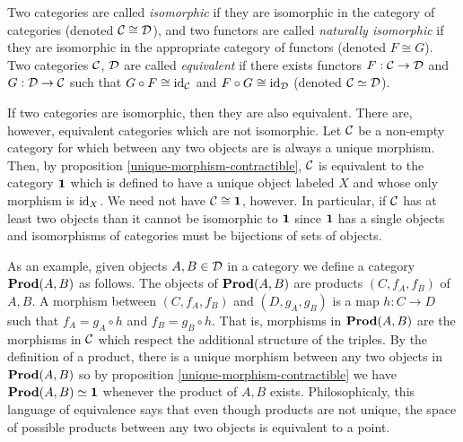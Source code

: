 \begin{defn} Two categories are called {\em isomorphic} if they are isomorphic in the category of categories (denoted ${\mathcal C}\cong {\mathcal D}$), and two functors are called {\em naturally isomorphic} if they are isomorphic in the appropriate category of functors (denoted $F\cong G$). Two categories ${\mathcal C}$, ${\mathcal D}$ are called {\em equivalent} if there exists functors $F:{\mathcal C}\to {\mathcal D}$ and $G:{\mathcal D}\to {\mathcal C}$ such that $G\circ F\cong\operatorname{id}_{\mathcal C}$ and $F\circ G\cong \operatorname{id}_{\mathcal D}$ (denoted ${\mathcal C}\simeq {\mathcal D}$).
\end{defn}

\begin{rem} If two categories are isomorphic, then they are also equivalent. There are, however, equivalent categories which are not isomorphic. Let ${\mathcal C}$ be a non-empty category for which between any two objects are is always a unique morphism. Then, by proposition \ref{unique-morphism-contractible}, ${\mathcal C}$ is equivalent to the category ${\bf 1}$ which is defined to have a unique object labeled $X$ and whose only morphism is $\operatorname{id}_X$. We need not have ${\mathcal C}\cong {\bf 1}$, however. In particular, if ${\mathcal C}$ has at least two objects than it cannot be isomorphic to $\bf 1$ since $\bf 1$ has a single objects and isomorphisms of categories must be bijections of sets of objects.

As an example, given objects $A,B\in {\mathcal D}$ in a category we define a category ${\bf Prod}(A,B)$ as follows. The objects of ${\bf Prod}(A,B)$ are products $(C,f_A,f_B)$ of $A,B$. A morphism between $(C,f_A,f_B)$ and $(D,g_A,g_B)$ is a map $h:C\to D$ such that $f_A=g_A\circ h$ and $f_B=g_B\circ h$. That is, morphisms in ${\bf Prod}(A,B)$ are the morphisms in ${\mathcal C}$ which respect the additional structure of the triples. By the definition of a product, there is a unique morphism between any two objects in ${\bf Prod}(A,B)$ so by proposition \ref{unique-morphism-contractible} we have ${\bf Prod}(A,B)\simeq {\bf 1}$ whenever the product of $A,B$ exists. Philosophicaly, this language of equivalence says that even though products are not unique, the space of possible products between any two objects is equivalent to a point.
\end{rem}



